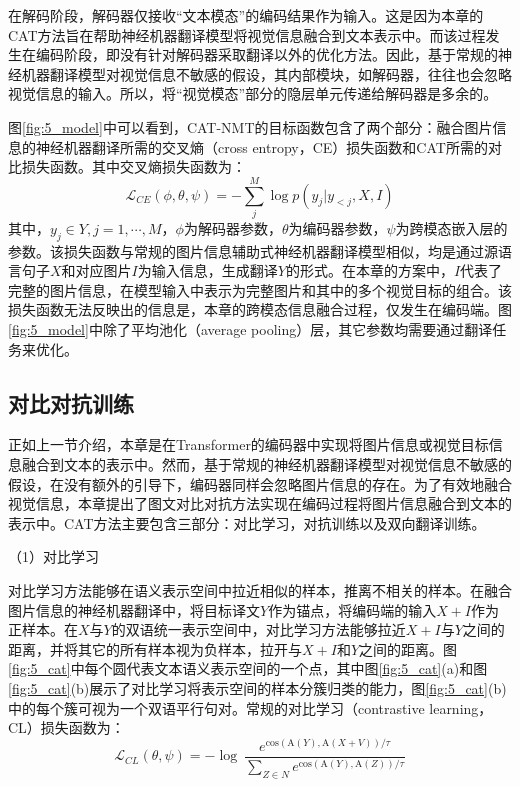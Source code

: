 在解码阶段，解码器仅接收“文本模态”的编码结果作为输入。这是因为本章的CAT方法旨在帮助神经机器翻译模型将视觉信息融合到文本表示中。而该过程发生在编码阶段，即没有针对解码器采取翻译以外的优化方法。因此，基于常规的神经机器翻译模型对视觉信息不敏感的假设，其内部模块，如解码器，往往也会忽略视觉信息的输入。所以，将“视觉模态”部分的隐层单元传递给解码器是多余的。

图\ref{fig:5_model}中可以看到，CAT-NMT的目标函数包含了两个部分：融合图片信息的神经机器翻译所需的交叉熵（cross entropy，CE）损失函数和CAT所需的对比损失函数。其中交叉熵损失函数为：
\begin{equation}
    \mathcal{L}_{CE}(\phi, \theta, \psi)=-\sum_j^M \log p(y_j|y_{<j},X,I)
\label{eq:5_cross_entropy}
\end{equation}
其中，$y_j \in Y,j=1,\cdots,M$，$\phi$为解码器参数，$\theta$为编码器参数，$\psi$为跨模态嵌入层的参数。该损失函数与常规的图片信息辅助式神经机器翻译模型相似，均是通过源语言句子$X$和对应图片$I$为输入信息，生成翻译$Y$的形式。在本章的方案中，$I$代表了完整的图片信息，在模型输入中表示为完整图片和其中的多个视觉目标的组合。该损失函数无法反映出的信息是，本章的跨模态信息融合过程，仅发生在编码端。图\ref{fig:5_model}中除了平均池化（average pooling）层，其它参数均需要通过翻译任务来优化。

\subsection{对比对抗训练}
\label{sec:5_cat}
正如上一节介绍，本章是在Transformer的编码器中实现将图片信息或视觉目标信息融合到文本的表示中。然而，基于常规的神经机器翻译模型对视觉信息不敏感的假设，在没有额外的引导下，编码器同样会忽略图片信息的存在。为了有效地融合视觉信息，本章提出了图文对比对抗方法实现在编码过程将图片信息融合到文本的表示中。CAT方法主要包含三部分：对比学习，对抗训练以及双向翻译训练。


{\sffamily （1）对比学习}

对比学习方法能够在语义表示空间中拉近相似的样本，推离不相关的样本。在融合图片信息的神经机器翻译中，将目标译文$Y$作为锚点，将编码端的输入$X+I$作为正样本。在$X$与$Y$的双语统一表示空间中，对比学习方法能够拉近$X+I$与$Y$之间的距离，并将其它的所有样本视为负样本，拉开与$X+I$和$Y$之间的距离。图\ref{fig:5_cat}中每个圆代表文本语义表示空间的一个点，其中图\ref{fig:5_cat}(a)和图\ref{fig:5_cat}(b)展示了对比学习将表示空间的样本分簇归类的能力，图\ref{fig:5_cat}(b)中的每个簇可视为一个双语平行句对。常规的对比学习（contrastive learning，CL）损失函数为：
\begin{equation}
    \mathcal{L}_{CL}(\theta, \psi)=-\log\ \frac{e^{\mathrm{cos}(\mathrm{A}(Y),\mathrm{A}(X+V))/\tau}}{\sum_{Z\in N}e^{\mathrm{cos}(\mathrm{A}(Y),\mathrm{A}(Z))/\tau}}
    \label{eq:5_contrastive_learning}
\end{equation}

